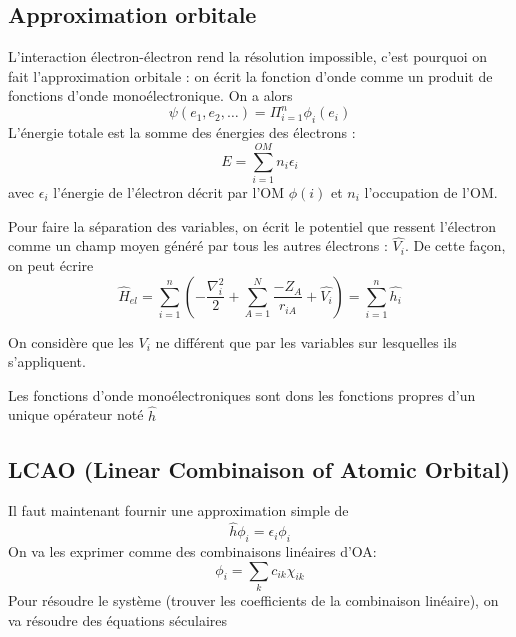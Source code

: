\documentclass[french]{yLectureNote}
\newcommand{\HH}{\hat{H}}
\newcommand{\lap}{\nabla^2}
\begin{document}
\subsection{Approximation orbitale}

L'interaction électron-électron rend la résolution impossible, c'est pourquoi on fait l'approximation orbitale : on écrit la fonction d'onde comme un produit de fonctions d'onde monoélectronique. On a alors \[\psi(e_1,e_2,\dots) = \Pi_{i=1}^n\phi_i(e_i)\] L'énergie totale est la somme des énergies des électrons : \[E = \sum_{i=1}^{OM}n_i \epsilon_i\] avec \(\epsilon_i\) l'énergie de l'électron décrit par l'OM \(\phi(i)\) et \(n_i\) l'occupation de l'OM.

Pour faire la séparation des variables, on écrit le potentiel que ressent l'électron comme un champ moyen généré par tous les autres électrons : \(\hat{V_i}\). De cette façon, on peut écrire
\[\HH_{el} = \sum_{i=1}^n(-\frac{\lap_i}{2}+\sum_{A=1}^N \frac{-Z_A}{r_{iA}}+\hat{V_i}) = \sum_{i=1}^n \hat{h_i}\]

On considère que les \(V_i\) ne différent que par les variables sur lesquelles ils s'appliquent.

Les fonctions d'onde monoélectroniques sont dons les fonctions propres d'un unique opérateur noté \(\hat{h}\)
\subsection{LCAO (Linear Combinaison of Atomic Orbital)}
Il faut maintenant fournir une approximation simple de \[\hat{h}\phi_i = \epsilon_i\phi_i\]
On va les exprimer comme des combinaisons linéaires d'OA:\[\phi_i = \sum_kc_{ik}\chi_{ik}\]
Pour résoudre le système (trouver les coefficients de la combinaison linéaire), on va résoudre des équations séculaires
\end{document}

